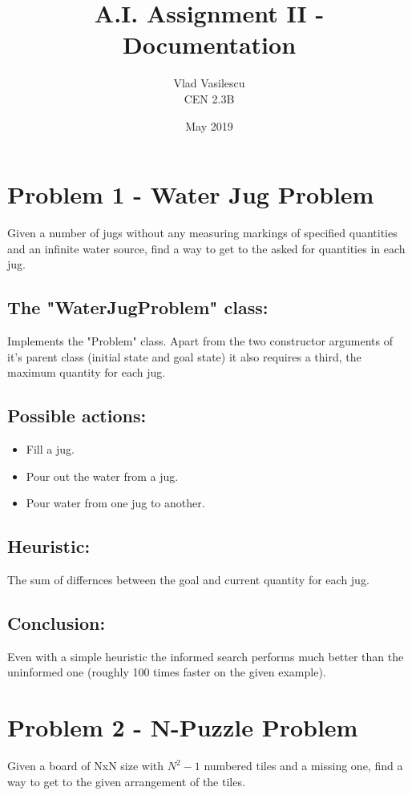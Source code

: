 \documentclass[a4paper, 12pt]{article}
\title{A.I. Assignment II - Documentation}
\author{Vlad Vasilescu \\ CEN 2.3B}
\date{May 2019}
\begin{document}
\maketitle

\section*{Problem 1 - Water Jug Problem}
Given a number of jugs without any measuring markings of specified quantities and an infinite water
source, find a way to get to the asked for quantities in each jug.

\subsection*{The "WaterJugProblem" class:}
Implements the "Problem" class. Apart from the two constructor arguments of it's parent class 
(initial state and goal state) it also requires a third, the maximum quantity for each jug.

\subsection*{Possible actions:}
\begin{itemize}
    \item Fill a jug.
    \item Pour out the water from a jug.
    \item Pour water from one jug to another.
\end{itemize}

\subsection*{Heuristic:}
The sum of differnces between the goal and current quantity for each jug.

\subsection*{Conclusion:}
Even with a simple heuristic the informed search performs much better than the uninformed one
(roughly 100 times faster on the given example).

\section*{Problem 2 - N-Puzzle Problem}
Given a board of NxN size with $N^{2} - 1$ numbered tiles and a missing one, find a way to
get to the given arrangement of the tiles.
\end{document}
